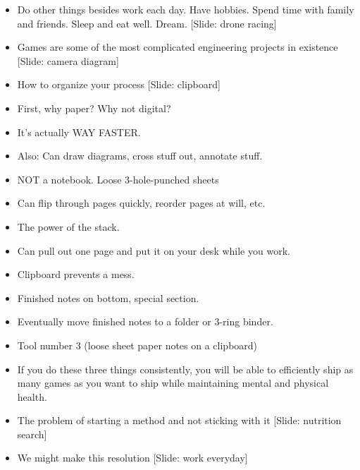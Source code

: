 \documentclass[12pt]{article}
\begin{document}
{\begin{itemize}
\item Do other things besides work each day.  Have hobbies.  Spend time with family and friends.  Sleep and eat well.  Dream. [Slide:  drone racing]


\item Games are some of the most complicated engineering projects in existence [Slide: camera diagram]

\item How to organize your process [Slide: clipboard]

\item First, why paper?  Why not digital?

\item It's actually WAY FASTER.

\item Also:  Can draw diagrams, cross stuff out, annotate stuff.

\item NOT a notebook.  Loose 3-hole-punched sheets

\item Can flip through pages quickly, reorder pages at will, etc.

\item The power of the stack.

\item Can pull out one page and put it on your desk while you work.

\item Clipboard prevents a mess.

\item Finished notes on bottom, special section.

\item Eventually move finished notes to a folder or 3-ring binder.

\item Tool number 3 (loose sheet paper notes on a clipboard)





\item If you do these three things consistently, you will be able to efficiently ship as many games as you want to ship while maintaining mental and physical health.

\item The problem of starting a method and not sticking with it [Slide: nutrition search]

\item We might make this resolution [Slide: work everyday]


\end{itemize}}
\end{document}
